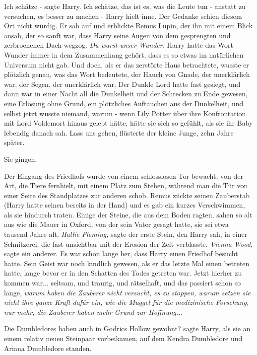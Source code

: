 \glqq{}Ich schätze -\grqq{} sagte Harry. \glqq{}Ich schätze, das ist es, was die
Leute tun - anstatt zu versuchen, es besser zu machen -\grqq{} Harry hielt inne.
Der Gedanke schien diesem Ort nicht würdig. Er sah auf und erblickte Remus
Lupin, der ihn mit einem Blick ansah, der so sanft war, dass Harry seine Augen
von dem gesprengten und zerbrochenen Dach wegzog. \emph{Du warst unser Wunder.}
Harry hatte das Wort \glqq{}Wunder\grqq{} immer in dem Zusammenhang gehört, dass
es so etwas im natürlichen Universum nicht gab. Und doch, als er das zerstörte
Haus betrachtete, wusste er plötzlich genau, was das Wort bedeutete, der Hauch
von Gnade, der unerklärlich war, der Segen, der unerklärlich war. Der Dunkle
Lord hatte fast gesiegt, und dann war in einer Nacht all die Dunkelheit und der
Schrecken zu Ende gewesen, eine Erlösung ohne Grund, ein plötzliches Auftauchen
aus der Dunkelheit, und selbst jetzt wusste niemand, warum - wenn Lily Potter
über ihre Konfrontation mit Lord Voldemort hinaus gelebt hätte, hätte sie sich
so gefühlt, als sie ihr Baby lebendig danach sah. \glqq{}Lass uns gehen\grqq{},
flüsterte der kleine Junge, zehn Jahre später.

Sie gingen.

Der Eingang des Friedhofs wurde von einem schlosslosen Tor bewacht, von der Art,
die Tiere fernhielt, mit einem Platz zum Stehen, während man die Tür von einer
Seite des Standplatzes zur anderen schob. Remus zückte seinen Zauberstab (Harry
hatte seinen bereits in der Hand) und es gab ein kurzes Verschwimmen, als sie
hindurch traten. Einige der Steine, die aus dem Boden ragten, sahen so alt aus
wie die Mauer in Oxford, von der sein Vater gesagt hatte, sie sei etwa tausend
Jahre alt. \emph{Hallie Fleming,} sagte der erste Stein, den Harry sah, in einer
Schnitzerei, die fast unsichtbar mit der Erosion der Zeit verblasste.
\emph{Vienna Wood}, sagte ein anderer. Es war schon lange her, dass Harry einen
Friedhof besucht hatte. Sein Geist war noch kindlich gewesen, als er das letzte
Mal einen betreten hatte, lange bevor er in den Schatten des Todes getreten war.
Jetzt hierher zu kommen war... seltsam, und traurig, und rätselhaft, und das
passiert schon so lange, \emph{warum haben die Zauberer nicht versucht, es zu
stoppen, warum setzen sie nicht ihre ganze Kraft dafür ein, wie die Muggel für
die medizinische Forschung, nur mehr, die Zauberer haben mehr Grund zur
Hoffnung...}

\glqq{}Die Dumbledores haben auch in Godrics Hollow gewohnt?\grqq{} sagte Harry,
als sie an einem relativ neuen Steinpaar vorbeikamen, auf dem Kendra Dumbledore
und Ariana Dumbledore standen.

